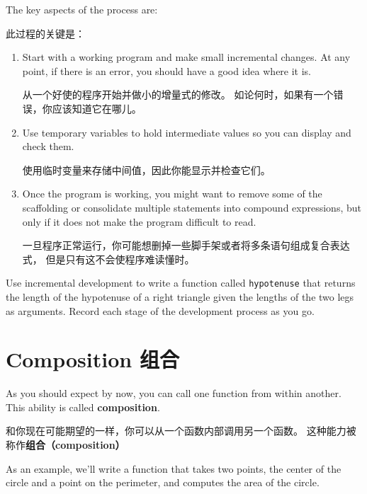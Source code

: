 \documentclass[10pt]{book}
\begin{document}
\begin{CJK}{UTF8}{gbsn}
The key aspects of the process are:

此过程的关键是：

\begin{enumerate}

\item Start with a working program and make small incremental changes. 
At any point, if there is an error, you should have a good idea
where it is.

从一个好使的程序开始并做小的增量式的修改。
如论何时，如果有一个错误，你应该知道它在哪儿。

\item Use temporary variables to hold intermediate values so you can
display and check them.

使用临时变量来存储中间值，因此你能显示并检查它们。

\item Once the program is working, you might want to remove some of
the scaffolding or consolidate multiple statements into compound
expressions, but only if it does not make the program difficult to
read.

一旦程序正常运行，你可能想删掉一些脚手架或者将多条语句组成复合表达式，
但是只有这不会使程序难读懂时。

\end{enumerate}

\begin{exercise}

Use incremental development to write a function
called {\tt hypotenuse} that returns the length of the hypotenuse of a
right triangle given the lengths of the two legs as arguments.
Record each stage of the development process as you go.
\end{exercise}


\section{Composition 组合}

As you should expect by now, you can call one function from
within another.  This ability is called {\bf composition}.

和你现在可能期望的一样，你可以从一个函数内部调用另一个函数。
这种能力被称作{\bf 组合（composition）}

As an example, we'll write a function that takes two points,
the center of the circle and a point on the perimeter, and computes
the area of the circle.


\end{CJK}
\end{document}
